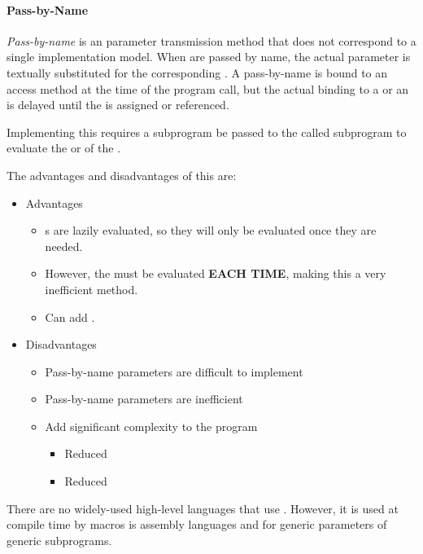 \paragraph{Pass-by-Name}\label{par:Parameter_Passing-Pass_By_Name}
\begin{definition}\label{def:Pass_By_Name}
  \emph{Pass-by-name} is an  parameter transmission method that does not correspond to a single implementation model.
  When  are passed by name, the actual parameter is textually substituted for the corresponding .
  A pass-by-name  is bound to an access method at the time of the program call, but the actual binding to a  or an  is delayed until the  is assigned or referenced.

  Implementing this requires a subprogram be passed to the called subprogram to evaluate the  or  of the .

  The advantages and disadvantages of this are:
  \begin{itemize}[noitemsep]
  \item Advantages
    \begin{itemize}[noitemsep]
    \item {}s are lazily evaluated, so they will only be evaluated once they are needed.
    \item However, the  must be evaluated \textbf{EACH TIME}, making this a very inefficient method.
    \item Can add .
    \end{itemize}
  \item Disadvantages
    \begin{itemize}[noitemsep]
    \item Pass-by-name parameters are difficult to implement
    \item Pass-by-name parameters are inefficient
    \item Add significant complexity to the program
      \begin{itemize}[noitemsep]
      \item Reduced 
      \item Reduced 
      \end{itemize}
    \end{itemize}
  \end{itemize}

  \begin{remark}\label{rmk:Langauges_Using_Pass_By_Name}
    There are no widely-used high-level languages that use .
    However, it is used at compile time by macros is assembly languages and for generic parameters of generic subprograms.
  \end{remark}
\end{definition}

